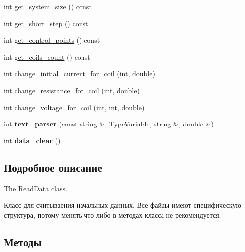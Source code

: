 \begin{DoxyCompactItemize}
int \hyperlink{class_plasma_lab_1_1_read_data_a4eedaa982a0fff4fd3b743d740cdbfd2}{get\+\_\+system\+\_\+size} () const
\item 
int \hyperlink{class_plasma_lab_1_1_read_data_aa5f9a888c78b78ae8548f74db9cc14f8}{get\+\_\+short\+\_\+step} () const
\item 
int \hyperlink{class_plasma_lab_1_1_read_data_ac0400550fc67a0f600ace130cd2bd836}{get\+\_\+control\+\_\+points} () const
\item 
int \hyperlink{class_plasma_lab_1_1_read_data_a14e4218fad93e3b8662b6962c20d501d}{get\+\_\+coils\+\_\+count} () const
\item 
int \hyperlink{class_plasma_lab_1_1_read_data_ab873979fa02ad4c08137aea49c13af92}{change\+\_\+initial\+\_\+current\+\_\+for\+\_\+coil} (int, double)
\item 
int \hyperlink{class_plasma_lab_1_1_read_data_af99edda5c788d9f21adc1388cc78b7ad}{change\+\_\+resistance\+\_\+for\+\_\+coil} (int, double)
\item 
int \hyperlink{class_plasma_lab_1_1_read_data_a3dd8682eaed60689b7e9e34b64decf6c}{change\+\_\+voltage\+\_\+for\+\_\+coil} (int, int, double)
\item 
\mbox{\label{class_plasma_lab_1_1_read_data_a868f82b22728543abeb34bc00e80f01f}} 
int {\bfseries text\+\_\+parser} (const string \&, \hyperlink{read__data_8h_a233198bb0ce1a8b5093842d60677bbd6}{Type\+Variable}, string \&, double \&)
\item 
\mbox{\label{class_plasma_lab_1_1_read_data_a34ec748da646d30d5f3f062154bb4c3d}} 
int {\bfseries data\+\_\+clear} ()
\end{DoxyCompactItemize}


\subsection{Подробное описание}
The \hyperlink{class_plasma_lab_1_1_read_data}{Read\+Data} class. 

Класс для считываения начальных данных. Все файлы имеют специфическую структура, потому менять что-\/либо в методах класса не рекомендуется. 

\subsection{Методы}
\mbox{\label{class_plasma_lab_1_1_read_data_ab873979fa02ad4c08137aea49c13af92}} 
